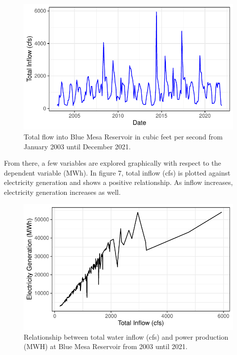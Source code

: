 \documentclass[
  12pt,
]{article}
\begin{document}
\begin{figure}

{\centering \includegraphics{Project_Report_files/figure-latex/total flow-1} 

}

\caption{Total flow into Blue Mesa Reservoir in cubic feet per second from January 2003 until December 2021.}\label{fig:total flow}
\end{figure}

From there, a few variables are explored graphically with respect to the
dependent variable (MWh). In figure 7, total inflow (cfs) is plotted
against electricity generation and shows a positive relationship. As
inflow increases, electricity generation increases as well.

\begin{figure}

{\centering \includegraphics{Project_Report_files/figure-latex/MWHxTotal-1} 

}

\caption{Relationship between total water inflow (cfs) and power production (MWH) at Blue Mesa Reservoir from 2003 until 2021.}\label{fig:MWHxTotal}
\end{figure}
\end{document}
